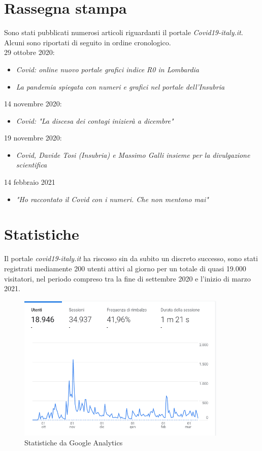 \section{Rassegna stampa}
Sono stati pubblicati numerosi articoli riguardanti il portale \emph{Covid19-italy.it}.\\
Alcuni sono riportati di seguito in ordine cronologico.\\

29 ottobre 2020: 
\begin{itemize}
    \item \emph{Covid: online nuovo portale grafici indice R0 in Lombardia}\cite{covid19-italy_ansa}
    \item \emph{La pandemia spiegata con numeri e grafici nel portale dell’Insubria}\cite{covid19-italy_varesenews}
\end{itemize}
14 novembre 2020:
\begin{itemize}
    \item \emph{Covid: "La discesa dei contagi inizierà a dicembre"}\cite{discesa_contagi_giorno}
\end{itemize}
19 novembre 2020:
\begin{itemize}
    \item \emph{Covid, Davide Tosi (Insubria) e Massimo Galli insieme per la divulgazione scientifica}\cite{covid_corriere_como}
\end{itemize}
14 febbraio 2021
\begin{itemize}
    \item \emph{"Ho raccontato il Covid con i numeri. Che non mentono mai"}\cite{raccontato_covid_ilgiorno}
\end{itemize}
\newpage
\section{Statistiche}
Il portale \emph{covid19-italy.it} ha riscosso sin da subito un discreto successo, sono stati registrati mediamente 200 utenti attivi al giorno per un totale di quasi 19.000 visitatori, nel periodo compreso tra la fine di settembre 2020 e l'inizio di marzo 2021.

\begin{figure}[htp]
    \centering
    \includegraphics[width=10cm]{img/analytics.png}
    \caption{Statistiche da Google Analytics}
    \label{fig:statistics}
\end{figure}
